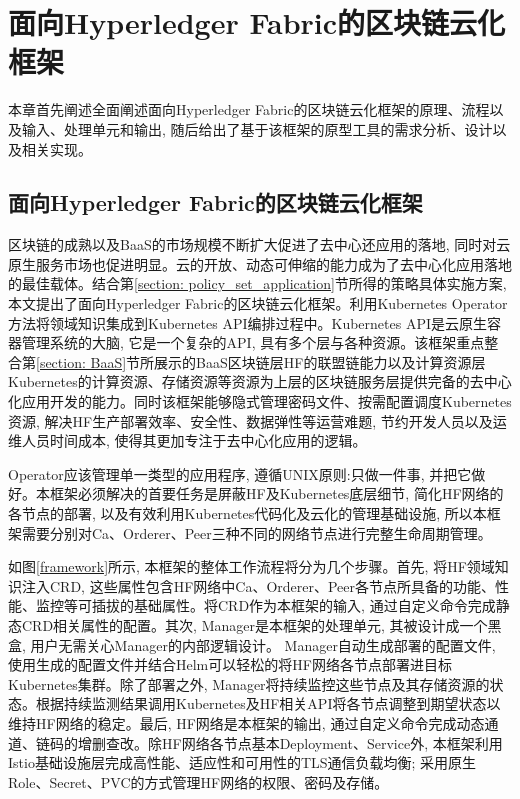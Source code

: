\chapter{面向Hyperledger Fabric的区块链云化框架}

本章首先阐述全面阐述面向Hyperledger Fabric的区块链云化框架的原理、流程以及输入、处理单元和输出, 随后给出了基于该框架的原型工具的需求分析、设计以及相关实现。

\section{面向Hyperledger Fabric的区块链云化框架}\label{section: framework}

区块链的成熟以及BaaS的市场规模不断扩大促进了去中心还应用的落地, 同时对云原生服务市场也促进明显。云的开放、动态可伸缩的能力成为了去中心化应用落地的最佳载体。结合第\ref{section: policy_set_application}节所得的策略具体实施方案, 本文提出了面向Hyperledger Fabric的区块链云化框架。利用Kubernetes Operator方法将领域知识集成到Kubernetes API编排过程中\cite{henning2021reproducible}。Kubernetes API是云原生容器管理系统的大脑, 它是一个复杂的API, 具有多个层与各种资源\cite{Yilmaz2021}。该框架重点整合第\ref{section: BaaS}节所展示的BaaS区块链层HF的联盟链能力以及计算资源层Kubernetes的计算资源、存储资源等资源为上层的区块链服务层提供完备的去中心化应用开发的能力。同时该框架能够隐式管理密码文件、按需配置调度Kubernetes资源, 解决HF生产部署效率、安全性、数据弹性等运营难题, 节约开发人员以及运维人员时间成本, 使得其更加专注于去中心化应用的逻辑。

Operator应该管理单一类型的应用程序, 遵循UNIX原则:只做一件事, 并把它做好\cite{d2020design}。本框架必须解决的首要任务是屏蔽HF及Kubernetes底层细节, 简化HF网络的各节点的部署, 以及有效利用Kubernetes代码化及云化的管理基础设施, 所以本框架需要分别对Ca、Orderer、Peer三种不同的网络节点进行完整生命周期管理。

如图\ref{framework}所示, 本框架的整体工作流程将分为几个步骤。首先, 将HF领域知识注入CRD, 这些属性包含HF网络中Ca、Orderer、Peer各节点所具备的功能、性能、监控等可插拔的基础属性。将CRD作为本框架的输入, 通过自定义命令完成静态CRD相关属性的配置。其次, Manager是本框架的处理单元, 其被设计成一个黑盒\cite{yu2020system}, 用户无需关心Manager的内部逻辑设计。 Manager自动生成部署的配置文件, 使用生成的配置文件并结合Helm可以轻松的将HF网络各节点部署进目标Kubernetes集群。除了部署之外, Manager将持续监控这些节点及其存储资源的状态。根据持续监测结果调用Kubernetes及HF相关API将各节点调整到期望状态以维持HF网络的稳定。最后, HF网络是本框架的输出, 通过自定义命令完成动态通道、链码的增删查改。除HF网络各节点基本Deployment、Service外, 本框架利用Istio基础设施层完成高性能、适应性和可用性\cite{li2019service}\cite{larsson2020impact}的TLS通信负载均衡; 采用原生Role、Secret、PVC的方式管理HF网络的权限、密码及存储。

